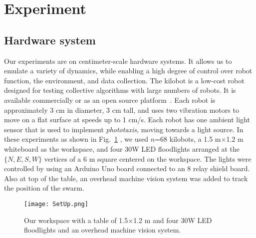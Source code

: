 
\section{Experiment}\label{sec:expResults}



\subsection{Hardware system}


Our experiments are on centimeter-scale hardware systems.  It allows us to emulate a variety of dynamics, while enabling a high degree of control over robot function, the environment, and data collection. The kilobot \cite{Rubenstein2012,rubenstein2014programmable} is a low-cost robot designed for testing collective algorithms with large numbers of robots. It is available commercially or as an open source platform~\cite{K-Team2015}.  Each robot is approximately 3 cm in diameter, 3 cm tall, and uses two vibration motors to move on a flat surface at speeds up to 1 cm/s.  Each robot has one ambient light sensor that is used to implement \emph{phototaxis},  moving towards a light source. 
In these experiments as shown in Fig.~\ref{fig:setup} , we used $n$=68 kilobots, a 1.5 m$\times$1.2 m whiteboard as the workspace, and four 30W LED floodlights arranged at the $\{N,E,S,W\}$ vertices of a 6 m square centered on the workspace. The lights were controlled by using an Arduino Uno board connected to an 8 relay shield board. Also at top of the table, an overhead machine vision system was added to track the position of the swarm.

\begin{figure}
\begin{center}
	\texttt{[image: SetUp.png]}
\end{center}
\caption{\label{fig:setup}
Our workspace with a table of 1.5$\times$1.2 m and four 30W LED floodlights and an overhead machine vision system.
}
\end{figure}